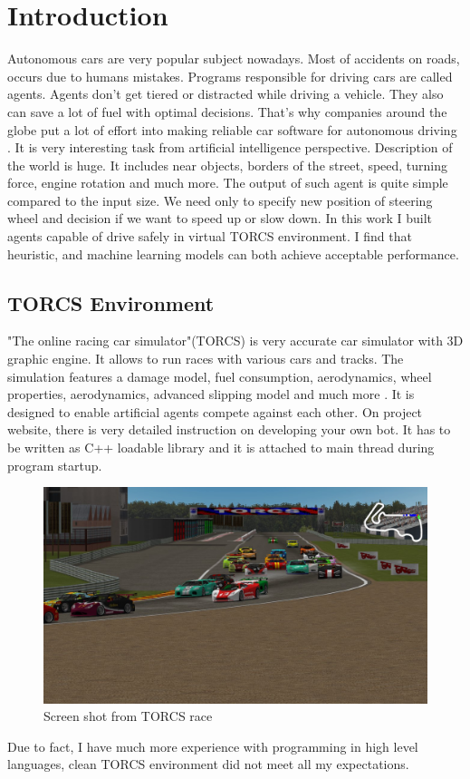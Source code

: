 \documentclass[declaration,shortabstract,english,inz]{iithesis}
\author         {Kacper Kulczak}
\begin{document}


\chapter{Introduction}

Autonomous cars are very popular subject nowadays.
Most of accidents on roads, occurs due to humans mistakes.
Programs responsible for driving cars are called agents.
Agents don't get tiered or distracted while driving a vehicle.
They also can save a lot of fuel with optimal decisions.
That's why companies around the globe put a lot of effort into making reliable car software for autonomous driving \cite{autonomus_driving}.
It is very interesting task from artificial intelligence perspective. Description of the world is huge.
It includes near objects, borders of the street, speed, turning force, engine rotation and much more.
The output of such agent is quite simple compared to the input size.
We need only to specify new position of steering wheel and decision if we want to speed up or slow down.
In this work  I built agents  capable of drive safely in virtual TORCS environment. I find that heuristic, and machine learning models can both achieve acceptable performance.



\section{TORCS Environment}
"The online racing car simulator"(TORCS) is very accurate car simulator with 3D graphic engine.
It allows to run races with various cars and tracks.
The simulation features a damage model, fuel consumption, aerodynamics, wheel properties, aerodynamics, advanced slipping model and much more \cite{TORCS}.
It is designed to enable artificial agents compete against each other.
On project website, there is very detailed instruction on developing your own bot.
It has to be written as C++ loadable library and it is attached to main thread during program startup.


\begin{figure}[h]
    \includegraphics[width=\linewidth]{img/torcs_look.jpeg}
    \caption{Screen shot from TORCS race \cite{TORCS}}
    \label{fig:torcs}
\end{figure}
Due to fact, I have much more experience with programming in high level languages, clean TORCS environment did not meet all my expectations. 
\end{document}
